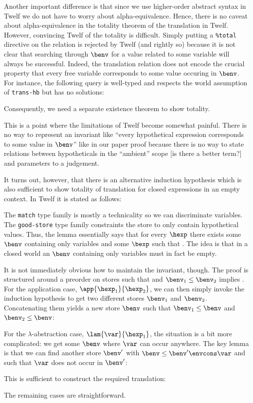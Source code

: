 Another important difference is that since we use higher-order abstract syntax in Twelf we do not have to worry about alpha-equivalence.
Hence, there is no caveat about alpha-equivalence in the totality theorem of the translation in Twelf.
However, convincing Twelf of the totality is difficult.
Simply putting a \texttt{\%total} directive on the relation is rejected by Twelf (and rightly so) because it is not clear that searching through $\benv$ for a value related to some variable will always be successful.
Indeed, the translation relation does not encode the crucial property that every free variable corresponds to some value occuring in $\benv$.
For instance, the following query is well-typed and respects the world assumption of \texttt{trans-hb} but has no solutions:

Consequently, we need a separate existence theorem to show totality.

This is a point where the limitations of Twelf become somewhat painful.
There is no way to represent an invariant like ``every hypothetical expression corresponds to some value in $\benv$'' like in our paper proof because there is no way to state relations between hypotheticals in the ``ambient'' scope [is there a better term?] and parameters to a judgement.

It turns out, however, that there is an alternative induction hypothesis which is also sufficient to show totality of translation for closed expressions in an empty context.
In Twelf it is stated as follows:

The \texttt{match} type family is mostly a technicality so we can discriminate variables.
The \texttt{good-store} type family constraints the store to only contain hypothetical values.
Thus, the lemma essentially says that for every $\hexp$ there exists some $\benv$ containing only variables and some $\bexp$ such that \trahb{\hbctx}{\benv}{\bexp}{\hexp}.
The idea is that in a closed world an $\benv$ containing only variables must in fact be empty.

It is not immediately obvious how to maintain the invariant, though.
The proof is structured around a preorder on stores such that  and $\benv_1 \le \benv_2$ implies .
For the application case, $\app{\hexp_1}{\hexp_2}$, we can then simply invoke the induction hypothesis to get two different stores $\benv_1$ and $\benv_2$.
Concatenating them yields a new store $\benv$ such that $\benv_1 \le \benv$ and $\benv_2 \le \benv$:

For the $\lambda$-abstraction case, $\lam{\var}{\hexp_1}$, the situation is a bit more complicated: we get some $\benv$ where $\var$ can occur anywhere.
The key lemma is that we can find another store $\benv'$ with $\benv \le \benv' \envcons \var$ and such that $\var$ does not occur in $\benv'$:

This is sufficient to construct the required translation:

The remaining cases are straightforward.
